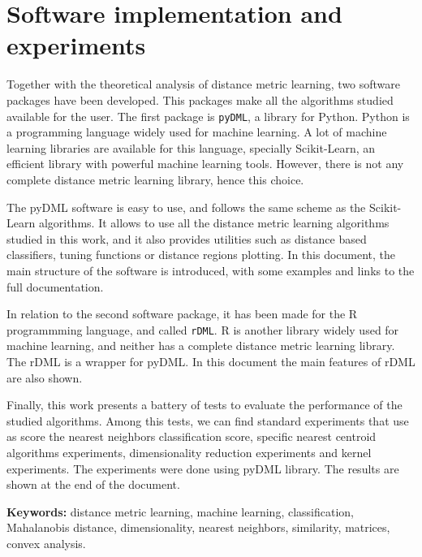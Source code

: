 \section*{Software implementation and experiments}

Together with the theoretical analysis of distance metric learning, two software packages have been developed. This packages make all the algorithms studied available for the user. The first package is \texttt{pyDML}, a library for Python. Python is a programming language widely used for machine learning. A lot of machine learning libraries are available for this language, specially Scikit-Learn, an efficient library with powerful machine learning tools. However, there is not any complete distance metric learning library, hence this choice.

The pyDML software is easy to use, and follows the same scheme as the Scikit-Learn algorithms. It allows to use all the distance metric learning algorithms studied in this work, and it also provides utilities such as distance based classifiers, tuning functions or distance regions plotting. In this document, the main structure of the software is introduced, with some examples and links to the full documentation.

In relation to the second software package, it has been made for the R programmming language, and called \texttt{rDML}. R is another library widely used for machine learning, and neither has a complete distance metric learning library. The rDML is a wrapper for pyDML. In this document the main features of rDML are also shown.

Finally, this work presents a battery of tests to evaluate the performance of the studied algorithms. Among this tests, we can find standard experiments that use as score the nearest neighbors classification score, specific nearest centroid algorithms experiments, dimensionality reduction experiments and kernel experiments. The experiments were done using pyDML library. The results are shown at the end of the document.


\textbf{Keywords: } distance metric learning, machine learning, classification, Mahalanobis distance, dimensionality, nearest neighbors, similarity, matrices, convex analysis.


